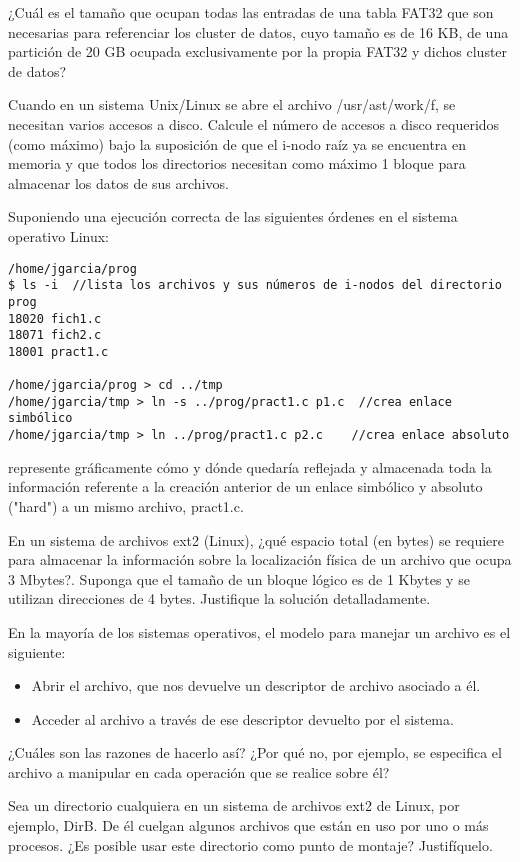 \begin{ejercicio}
¿Cuál es el tamaño que ocupan todas las entradas de una tabla FAT32 que son necesarias para referenciar los cluster de datos, cuyo tamaño es de 16 KB, de una partición de 20 GB ocupada exclusivamente por la propia FAT32 y dichos cluster de datos?
\end{ejercicio}

\begin{ejercicio}
Cuando en un sistema Unix/Linux se abre el archivo /usr/ast/work/f, se necesitan varios accesos a disco. Calcule el número de accesos a disco requeridos (como máximo) bajo la suposición de que el i-nodo raíz ya se encuentra en memoria y que todos los directorios necesitan como máximo 1 bloque para almacenar los datos de sus archivos.
\end{ejercicio}
\begin{ejercicio}
Suponiendo una ejecución correcta de las siguientes órdenes en el sistema operativo Linux:

\begin{verbatim}
/home/jgarcia/prog
$ ls -i  //lista los archivos y sus números de i-nodos del directorio prog
18020 fich1.c
18071 fich2.c
18001 pract1.c

/home/jgarcia/prog > cd ../tmp
/home/jgarcia/tmp > ln -s ../prog/pract1.c p1.c  //crea enlace simbólico
/home/jgarcia/tmp > ln ../prog/pract1.c p2.c    //crea enlace absoluto
\end{verbatim}

represente gráficamente cómo y dónde quedaría reflejada y almacenada toda la información referente a la creación anterior de un enlace simbólico y absoluto ("hard") a un mismo archivo, pract1.c.
\end{ejercicio}

\begin{ejercicio}
En un sistema de archivos ext2 (Linux), ¿qué espacio total (en bytes) se requiere para almacenar la información sobre la localización física de un archivo que ocupa 3 Mbytes?. Suponga que el tamaño de un bloque lógico es de 1 Kbytes y se utilizan direcciones de 4 bytes. Justifique la solución detalladamente.
\end{ejercicio}

\begin{ejercicio}
En la mayoría de los sistemas operativos, el modelo para manejar un archivo es el siguiente:
\begin{itemize}
    \item Abrir el archivo, que nos devuelve un descriptor de archivo asociado a él.
    \item Acceder al archivo a través de ese descriptor devuelto por el sistema.
\end{itemize}
¿Cuáles son las razones de hacerlo así? ¿Por qué no, por ejemplo, se especifica el archivo a manipular en cada operación que se realice sobre él?
\end{ejercicio}

\begin{ejercicio}
Sea un directorio cualquiera en un sistema de archivos ext2 de Linux, por ejemplo, DirB. De él cuelgan algunos archivos que están en uso por uno o más procesos. ¿Es posible usar este directorio como punto de montaje? Justifíquelo.
\end{ejercicio}